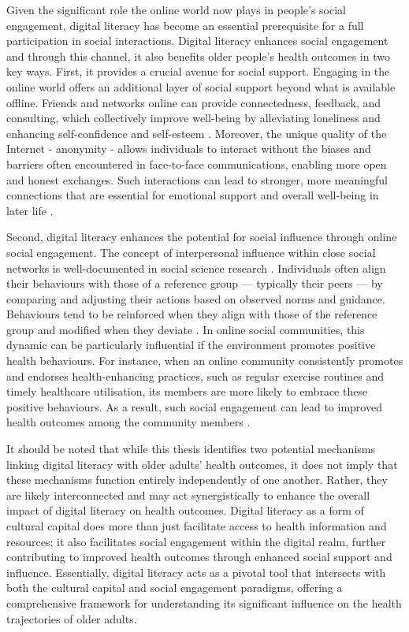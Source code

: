 Given the significant role the online world now plays in people's social engagement, digital literacy has become an essential prerequisite for a full participation in social interactions. Digital literacy enhances social engagement and through this channel, it also benefits older people's health outcomes in two key ways. First, it provides a crucial avenue for social support. Engaging in the online world offers an additional layer of social support beyond what is available offline. Friends and networks online can provide connectedness, feedback, and consulting, which collectively improve well-being by alleviating loneliness and enhancing self-confidence and self-esteem \parencite{czaja_improving_2018}. Moreover, the unique quality of the Internet - anonymity - allows individuals to interact without the biases and barriers often encountered in face-to-face communications, enabling more open and honest exchanges. Such interactions can lead to stronger, more meaningful connections that are essential for emotional support and overall well-being in later life \parencite{wangberg_relations_2008}.

Second, digital literacy enhances the potential for social influence through online social engagement. The concept of interpersonal influence within close social networks is well-documented in social science research \parencite{zagenczyk_social_2010}. Individuals often align their behaviours with those of a reference group — typically their peers — by comparing and adjusting their actions based on observed norms and guidance. Behaviours tend to be reinforced when they align with those of the reference group and modified when they deviate \parencite{marsden_network_1993}. In online social communities, this dynamic can be particularly influential if the environment promotes positive health behaviours. For instance, when an online community consistently promotes and endorses health-enhancing practices, such as regular exercise routines and timely healthcare utilisation, its members are more likely to embrace these positive behaviours. As a result, such social engagement can lead to improved health outcomes among the community members \parencite{poirier_social_2012}.

It should be noted that while this thesis identifies two potential mechanisms linking digital literacy with older adults' health outcomes, it does not imply that these mechanisms function entirely independently of one another. Rather, they are likely interconnected and may act synergistically to enhance the overall impact of digital literacy on health outcomes. Digital literacy as a form of cultural capital does more than just facilitate access to health information and resources; it also facilitates social engagement within the digital realm, further contributing to improved health outcomes through enhanced social support and influence. Essentially, digital literacy acts as a pivotal tool that intersects with both the cultural capital and social engagement paradigms, offering a comprehensive framework for understanding its significant influence on the health trajectories of older adults.

